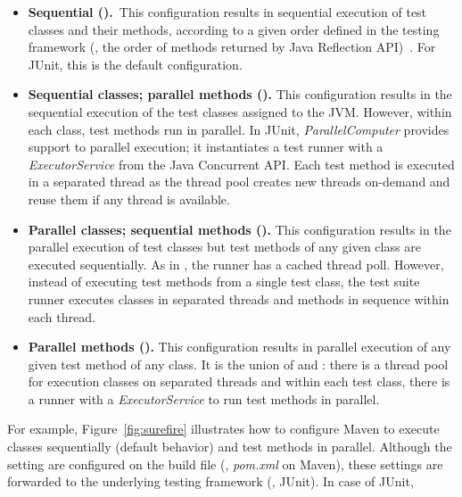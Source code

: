 \begin{itemize}
\item \textbf{Sequential (\Seq).}~This configuration results in
    sequential execution of test classes and their methods, according
    to a given order defined in the testing framework (\eg, the order
    of methods returned by Java Reflection
    API)~\cite{junit-test-order}. For JUnit, this is the default
    configuration.

\item \textbf{Sequential classes; parallel methods
  (\ParClassSeqMeth{}).} This configuration results in the sequential
  execution of the test classes assigned to the JVM.  However, within
  each class, test methods run in parallel. In JUnit,
  \emph{ParallelComputer} provides support to parallel execution; it
  instantiates a test runner with a \emph{ExecutorService} from the
  Java Concurrent API. Each test method is executed in a separated
  thread as the thread pool creates new threads on-demand and reuse
  them if any thread is available.


\item \textbf{Parallel classes; sequential methods
  (\SeqClassParMeth{}).}  This configuration results in the parallel
  execution of test classes but test methods of any given class are
  executed sequentially. As in \ParClassSeqMeth, the runner has a
  cached thread poll. However, instead of executing test methods from
  a single test class, the test suite runner executes classes in
  separated threads and methods in sequence within each thread.

\item \textbf{Parallel methods (\ParClassParMeth).} This configuration
  results in parallel execution of any given test method of any class.
  It is the union of \ParClassSeqMeth and \SeqClassParMeth: there is a
  thread pool for execution classes on separated threads and within
  each test class, there is a runner with a \emph{ExecutorService} to
  run test methods in parallel.
\end{itemize}

 For example, Figure~\ref{fig:surefire}
illustrates how to configure Maven to execute classes sequentially
(default behavior) and test methods in parallel. Although the setting
are configured on the build file (\eg, \emph{pom.xml} on Maven), these
settings are forwarded to the underlying testing framework (\eg,
JUnit). In case of JUnit, 


